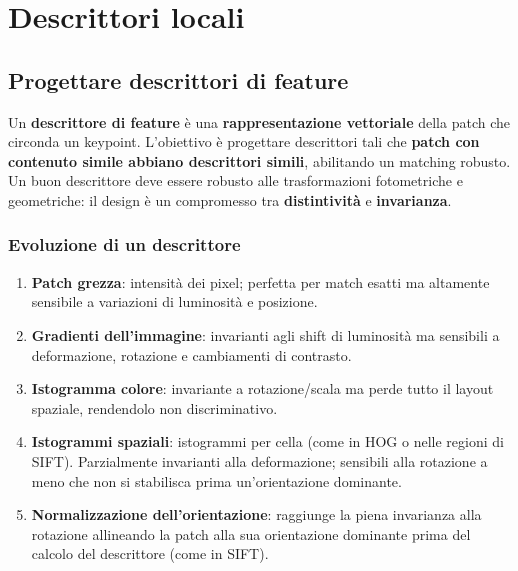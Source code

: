\documentclass[12pt, a4paper]{report}
\begin{document}
\chapter{Descrittori locali}

\section{Progettare descrittori di feature}

\begin{defbox}
Un \textbf{descrittore di feature} è una \textbf{rappresentazione vettoriale} della
patch che circonda un keypoint. L'obiettivo è progettare descrittori tali che
\textbf{patch con contenuto simile abbiano descrittori simili}, abilitando un
matching robusto. Un buon descrittore deve essere robusto alle trasformazioni
fotometriche e geometriche: il design è un compromesso tra \textbf{distintività}
e \textbf{invarianza}.
\end{defbox}

\subsection{Evoluzione di un descrittore}

\begin{enumerate}
  \item \textbf{Patch grezza}: intensità dei pixel; perfetta per match esatti ma
        altamente sensibile a variazioni di luminosità e posizione.
  \item \textbf{Gradienti dell'immagine}: invarianti agli shift di luminosità ma
        sensibili a deformazione, rotazione e cambiamenti di contrasto.
  \item \textbf{Istogramma colore}: invariante a rotazione/scala ma perde tutto
        il layout spaziale, rendendolo non discriminativo.
  \item \textbf{Istogrammi spaziali}: istogrammi per cella (come in HOG o nelle
        regioni di SIFT). Parzialmente invarianti alla deformazione; sensibili alla
        rotazione a meno che non si stabilisca prima un'orientazione dominante.
  \item \textbf{Normalizzazione dell'orientazione}: raggiunge la piena invarianza
        alla rotazione allineando la patch alla sua orientazione dominante prima
        del calcolo del descrittore (come in SIFT).
\end{enumerate}
\end{document}
